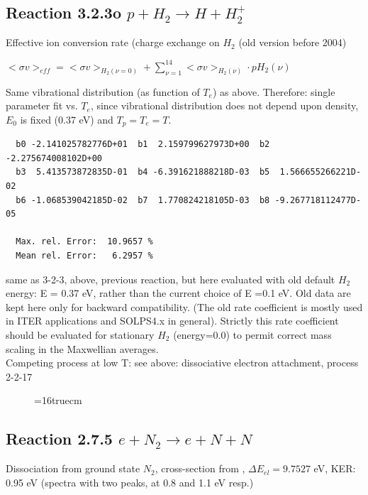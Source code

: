 \documentclass[12pt,dvips]{article}
\begin{document}
\newpage

\subsection{
Reaction 3.2.3o   $p + H_2 \rightarrow H + H_2^+  $}

  Effective ion conversion rate (charge exchange on $H_2$ (old version before 2004)

  $ <\sigma v>_{eff} = <\sigma v>_{H_2(\nu=0)} + \sum_{\nu=1}^{14}
<\sigma v>_{H_2(\nu)} \cdot pH_2(\nu) $

  Same vibrational distribution (as function of $T_e$) as above.
  Therefore:
  single parameter fit vs. $T_e$,
  since vibrational distribution does not depend upon density, $E_0$ is fixed
  (0.37 eV) and $T_p = T_e = T$.

\begin{small}\begin{verbatim}
  b0 -2.141025782776D+01  b1  2.159799627973D+00  b2 -2.275674008102D+00
  b3  5.413573872835D-01  b4 -6.391621888218D-03  b5  1.566655266221D-02
  b6 -1.068539042185D-02  b7  1.770824218105D-03  b8 -9.267718112477D-05

  Max. rel. Error:  10.9657 %
  Mean rel. Error:   6.2957 %
\end{verbatim}
\end{small}
same as 3-2-3, above, previous reaction, but here evaluated with old default $H_2$ energy: E = 0.37 eV, rather than
the current choice of E =0.1 eV.
Old data are kept here only for backward compatibility.
(The old rate coefficient is mostly used in ITER applications
and SOLPS4.x in general).
Strictly this rate coefficient should be evaluated for stationary $H_2$  (energy=0.0) to permit
correct mass scaling in the Maxwellian averages.
\\
Competing process at low T: see above: dissociative electron attachment, process 2-2-17
\begin{figure} \label{3.2.3o}
\epsfxsize=16truecm
\end{figure}
\newpage

\subsection{
Reaction 2.7.5  $e + N_2 \rightarrow e + N + N$ }
Dissociation from ground state $N_2$, cross-section from \cite{kn:Cosby},
$\Delta E_{el} = 9.7527 $ eV, KER: 0.95 eV  (spectra with two peaks, at 0.8 and 1.1 eV resp.)
\end{document}
